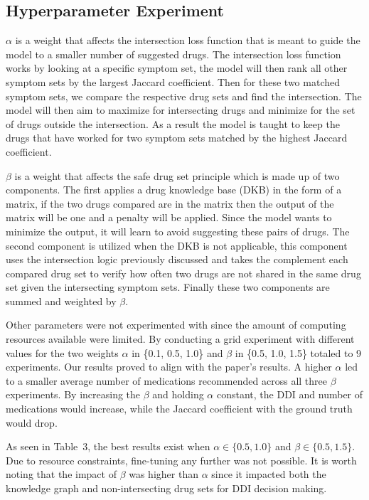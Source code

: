 \documentclass[letterpaper]{article} %
\begin{document}
\subsection{Hyperparameter Experiment}
$\alpha$ is a weight that affects the intersection loss function that is meant to guide the model to a smaller number of suggested drugs. The intersection loss function works by looking at a specific symptom set, the model will then rank all other symptom sets by the largest Jaccard coefficient.  Then for these two matched symptom sets, we compare the respective drug sets and find the intersection.  The model will then aim to maximize for intersecting drugs and minimize for the set of drugs outside the intersection.  As a result the model is taught to keep the drugs that have worked for two symptom sets matched by the highest Jaccard coefficient.  

$\beta$ is a weight that affects the safe drug set principle which is made up of two components.  The first applies a drug knowledge base (DKB) in the form of a matrix, if the two drugs compared are in the matrix then the output of the matrix will be one and a penalty will be applied.  Since the model wants to minimize the output, it will learn to avoid suggesting these pairs of drugs.  The second component is utilized when the DKB is not applicable, this component uses the intersection logic previously discussed and takes the complement each compared drug set to verify how often two drugs are not shared in the same drug set given the intersecting symptom sets.  Finally these two components are summed and weighted by $\beta$. 

Other parameters were not experimented with since the amount of computing resources available were limited.  By conducting a grid experiment with different values for the two weights $\alpha$ in \{0.1, 0.5, 1.0\} and $\beta$ in \{0.5, 1.0, 1.5\} totaled to 9 experiments.  Our results proved to align with the paper's results.  A higher $\alpha$ led to a smaller average number of medications recommended across all three $\beta$ experiments.  By increasing the $\beta$ and holding $\alpha$ constant, the DDI and number of medications would increase, while the Jaccard coefficient with the ground truth would drop.   

As seen in Table~3, the best results exist when $\alpha \in \{0.5, 1.0\}$ and $\beta \in \{0.5, 1.5\}$. Due to resource constraints, fine-tuning any further was not possible.  It is worth noting that the impact of $\beta$ was higher than $\alpha$ since it impacted both the knowledge graph and non-intersecting drug sets for DDI decision making.  
\end{document}

